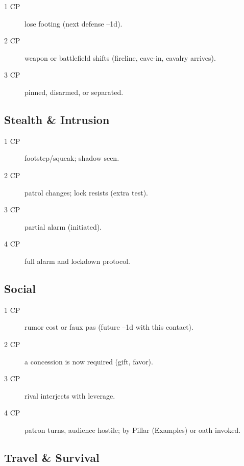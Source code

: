 \begin{description}
\item[1 CP] lose footing (next defense --1d).
\item[2 CP] weapon or battlefield shifts (fireline, cave-in, cavalry arrives).
\item[3 CP] pinned, disarmed, or separated.
\end{description}

\subsection{Stealth \& Intrusion}

\begin{description}
\item[1 CP] footstep/squeak; shadow seen.
\item[2 CP] patrol changes; lock resists (extra test).
\item[3 CP] partial alarm (initiated).
\item[4 CP] full alarm and lockdown protocol.
\end{description}

\subsection{Social}

\begin{description}
\item[1 CP] rumor cost or faux pas (future --1d with this contact).
\item[2 CP] a concession is now required (gift, favor).
\item[3 CP] rival interjects with leverage.
\item[4 CP] patron turns, audience hostile; by Pillar (Examples) or oath invoked.
\end{description}

\subsection{Travel \& Survival}

